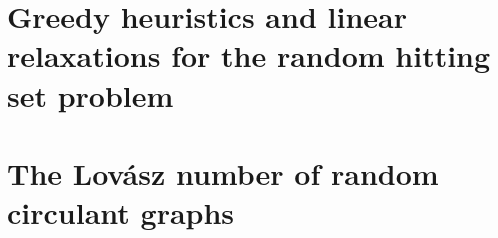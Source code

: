 \chapter[Greedy heuristics]{Greedy heuristics and linear relaxations for the random hitting set problem}
\label{chap:greedy}
% 





\chapter[Lovasz number]{The Lovász number of random circulant graphs}
\label{chap:lovasz}





